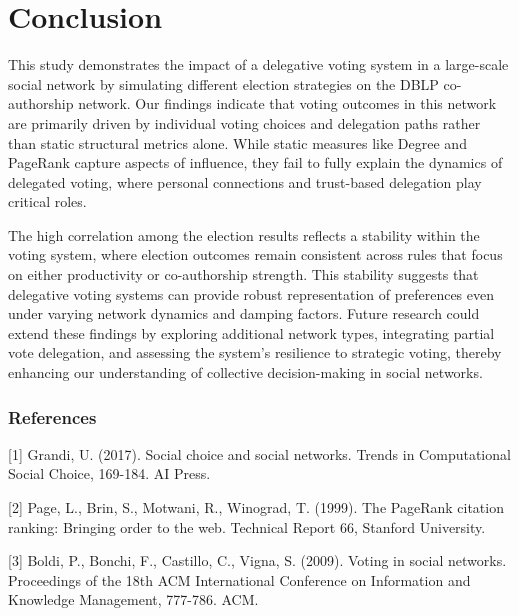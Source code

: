 \documentclass{article} %
\begin{document}
\section{Conclusion}
This study demonstrates the impact of a delegative voting system in a large-scale social network by simulating different election strategies on the DBLP co-authorship network. Our findings indicate that voting outcomes in this network are primarily driven by individual voting choices and delegation paths rather than static structural metrics alone. While static measures like Degree and PageRank capture aspects of influence, they fail to fully explain the dynamics of delegated voting, where personal connections and trust-based delegation play critical roles.

The high correlation among the election results reflects a stability within the voting system, where election outcomes remain consistent across rules that focus on either productivity or co-authorship strength. This stability suggests that delegative voting systems can provide robust representation of preferences even under varying network dynamics and damping factors. Future research could extend these findings by exploring additional network types, integrating partial vote delegation, and assessing the system’s resilience to strategic voting, thereby enhancing our understanding of collective decision-making in social networks.

\newpage
\subsubsection*{References}

\small{
[1] Grandi, U. (2017). Social choice and social networks. Trends in Computational Social Choice, 169-184. AI Press.

[2] Page, L., Brin, S., Motwani, R., Winograd, T. (1999). The PageRank citation ranking: Bringing order to the web. Technical Report 66, Stanford University.

[3] Boldi, P., Bonchi, F., Castillo, C., Vigna, S. (2009). Voting in social networks. Proceedings of the 18th ACM International Conference on Information and Knowledge Management, 777-786. ACM.
}
\end{document}

